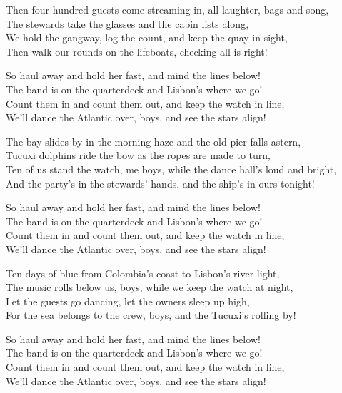 \begin{lyrics}
Then four hundred guests come streaming in, all laughter, bags and song,\\
The stewards take the glasses and the cabin lists along,\\
We hold the gangway, log the count, and keep the quay in sight,\\
Then walk our rounds on the lifeboats, checking all is right!

So haul away and hold her fast, and mind the lines below!\\
The band is on the quarterdeck and Lisbon’s where we go!\\
Count them in and count them out, and keep the watch in line,\\
We’ll dance the Atlantic over, boys, and see the stars align!

The bay slides by in the morning haze and the old pier falls astern,\\
Tucuxi dolphins ride the bow as the ropes are made to turn,\\
Ten of us stand the watch, me boys, while the dance hall’s loud and bright,\\
And the party’s in the stewards’ hands, and the ship’s in ours tonight!

So haul away and hold her fast, and mind the lines below!\\
The band is on the quarterdeck and Lisbon’s where we go!\\
Count them in and count them out, and keep the watch in line,\\
We’ll dance the Atlantic over, boys, and see the stars align!

Ten days of blue from Colombia’s coast to Lisbon’s river light,\\
The music rolls below us, boys, while we keep the watch at night,\\
Let the guests go dancing, let the owners sleep up high,\\
For the sea belongs to the crew, boys, and the Tucuxi’s rolling by!

So haul away and hold her fast, and mind the lines below!\\
The band is on the quarterdeck and Lisbon’s where we go!\\
Count them in and count them out, and keep the watch in line,\\
We’ll dance the Atlantic over, boys, and see the stars align!
\end{lyrics}

